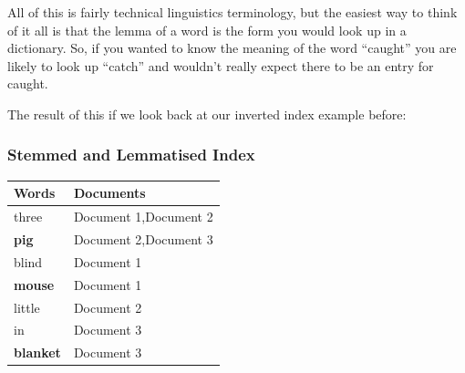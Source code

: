 \documentclass{beamer}
\begin{document}
{  All of this is fairly technical linguistics terminology, but the easiest way to think of
  it all is that the lemma of a word is the form you would look up in a dictionary. So,
  if you wanted to know the meaning of the word ``caught'' you are likely to look
  up ``catch'' and wouldn't really expect there to be an entry for caught.

  The result of this if we look back at our inverted index example before:
}

\begin{frame}
  \frametitle{Stemmed and Lemmatised Index}
  \begin{center}
    \begin{tabular}{|l|l|}
      \hline
      \bf{Words}     & \bf{Documents}              \\ \hline
      three    & Document 1,Document 2\\ \hline
      \bf{pig}     & Document 2,Document 3 \\ \hline
      blind    & Document 1             \\ \hline
      \bf{mouse}     & Document 1             \\ \hline
      little   & Document 2             \\ \hline
      in       & Document 3             \\ \hline
      \bf{blanket} & Document 3             \\ \hline
    \end{tabular}

  \end{center}
\end{frame}
\end{document}
